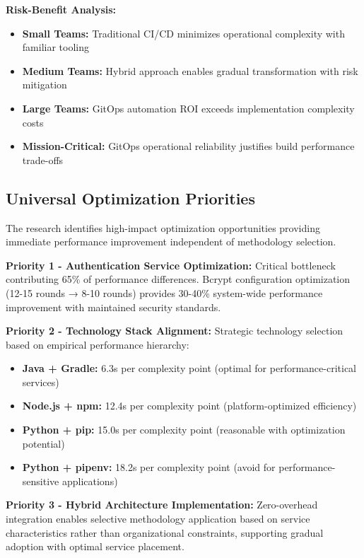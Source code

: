 \textbf{Risk-Benefit Analysis:}
\begin{itemize}
\item \textbf{Small Teams:} Traditional CI/CD minimizes operational complexity with familiar tooling
\item \textbf{Medium Teams:} Hybrid approach enables gradual transformation with risk mitigation
\item \textbf{Large Teams:} GitOps automation ROI exceeds implementation complexity costs
\item \textbf{Mission-Critical:} GitOps operational reliability justifies build performance trade-offs
\end{itemize}

\subsection{Universal Optimization Priorities}
\label{subsec:optimization_priorities}

The research identifies high-impact optimization opportunities providing immediate performance improvement independent of methodology selection.

\textbf{Priority 1 - Authentication Service Optimization:}
Critical bottleneck contributing 65\% of performance differences. Bcrypt configuration optimization (12-15 rounds → 8-10 rounds) provides 30-40\% system-wide performance improvement with maintained security standards.

\textbf{Priority 2 - Technology Stack Alignment:}
Strategic technology selection based on empirical performance hierarchy:
\begin{itemize}
\item \textbf{Java + Gradle:} 6.3s per complexity point (optimal for performance-critical services)
\item \textbf{Node.js + npm:} 12.4s per complexity point (platform-optimized efficiency)
\item \textbf{Python + pip:} 15.0s per complexity point (reasonable with optimization potential)
\item \textbf{Python + pipenv:} 18.2s per complexity point (avoid for performance-sensitive applications)
\end{itemize}

\textbf{Priority 3 - Hybrid Architecture Implementation:}
Zero-overhead integration enables selective methodology application based on service characteristics rather than organizational constraints, supporting gradual adoption with optimal service placement.

